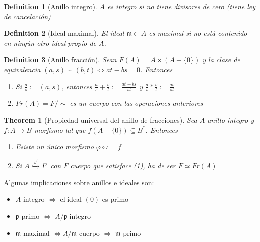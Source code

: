 \documentclass[leqno]{article}
\newtheorem*{theorem}{Theorem}
\newtheorem*{definition}{Definition}
\begin{document}
\begin{definition}[Anillo integro] $A$ es integro si no tiene divisores de cero (tiene ley de cancelación)
\end{definition}

\begin{definition}[Ideal maximal] 
El ideal $\mathfrak{m}\subset A$ es maximal si no está contenido en ningún otro ideal propio de $A$.
\end{definition}

\begin{definition}[Anillo fracción] Sean $F(A) = A\times (A-\{0\})$ y la clase de equivalencia $(a, s) \sim (b,t) \iff at-bs=0$. Entonces
  \begin{enumerate}[topsep=-6pt, itemsep=0pt]
	\item Si  $\frac{a}{s}:=(a, s)$, entonces $\frac{a}{s}+ \frac{b}{t} := \frac{at+bs}{st}$ y $\frac{a}{s}*\frac{b}{t}:=\frac{ab}{st}$
    \item $Fr(A) = F/\sim$ es un cuerpo con las operaciones anteriores
  \end{enumerate}
\end{definition}

\begin{theorem}[Propiedad universal del anillo de fracciones] Sea $A$ anillo integro y  $f:A\to B$ morfismo tal que $f(A-\{0\})\subseteq B^*$. Entonces
  \begin{enumerate}[topsep=-6pt, itemsep=0pt]
    \item Esiste un único morfismo $\varphi \circ \iota =f$ 
  \item Si $A \xhookrightarrow{\iota'} F$ con $F$ cuerpo que satisface (1), ha de ser $F \simeq  Fr(A)$
  \end{enumerate}
\end{theorem}


Algunas implicaciones sobre anillos e ideales son:
\begin{itemize}[topsep=-6pt, itemsep=0pt]
  \item $A$ integro $\iff$ el ideal $(0)$ es primo
  \item $\mathfrak{p}$ primo $\iff$ $A/\mathfrak{p}$ integro
  \item $\mathfrak{m}$ maximal $\iff A /\mathfrak{m}$ cuerpo $\Rightarrow$ $\mathfrak{m}$ primo
\end{itemize}
\end{document}
